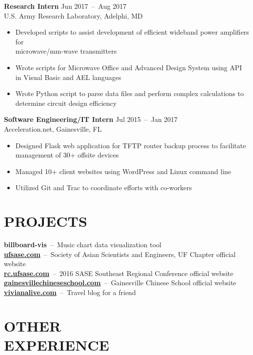 \documentclass[line,resmargin]{res}
\begin{document}
\begin{resume}
    \textbf{Research Intern}    \hfill Jun 2017~--~Aug 2017 \\
    U.S. Army Research Laboratory, Adelphi, MD
    \begin{itemize}  \itemsep -2pt %
        \item Developed scripts to assist development of efficient wideband power amplifiers for
        \\microwave/mm-wave transmitters
        \item Wrote scripts for Microwave Office and Advanced Design System using API in Visual Basic and AEL languages
        \item Wrote Python script to parse data files and perform complex calculations to determine circuit design efficiency
    \end{itemize}

    \textbf{Software Engineering/IT Intern}    \hfill Jul 2015~--~Jan 2017 \\
    Acceleration.net, Gainesville, FL
    \begin{itemize}  \itemsep -2pt %
        \item Designed Flask web application for TFTP router backup process to facilitate management of 30+ offsite devices
        \item Managed 10+ client websites using WordPress and Linux command line
        \item Utilized Git and Trac to coordinate efforts with co-workers
    \end{itemize}

\section{PROJECTS}
    \textbf{billboard-vis}~--~Music chart data visualization tool \\
    \textbf{\href{http://ufsase.com}{ufsase.com}}~--~Society of Asian Scientists and Engineers, UF Chapter official website \\
    \textbf{\href{http://rc.ufsase.com}{rc.ufsase.com}}~--~2016 SASE Southeast Regional Conference official website \\
    \textbf{\href{https://gainesvillechineseschool.com}{gainesvillechineseschool.com}}~--~Gainesville Chinese School official website \\
    \textbf{\href{https://vivianalive.com}{vivianalive.com}}~--~Travel blog for a friend


\section{OTHER \\ EXPERIENCE}


\end{resume}
\end{document}
